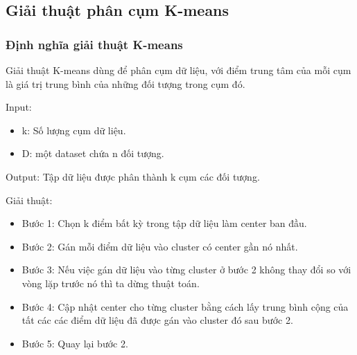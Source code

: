 \documentclass[a4paper,14pt]{extreport}
\begin{document}
\subsection{Giải thuật phân cụm K-means}

\subsubsection*{ Định nghĩa giải thuật K-means }

Giải thuật K-means dùng để phân cụm dữ liệu, với điểm trung tâm của mỗi cụm là giá trị trung bình của những đối tượng trong cụm đó.

Input:
\begin{itemize}
        \item k: Số lượng cụm dữ liệu.
        \item D: một dataset chứa n đối tượng.
\end{itemize}

Output: Tập dữ liệu được phân thành k cụm các đối tượng.

Giải thuật:

\begin{itemize}
        \item Bước 1: Chọn k điểm bất kỳ trong tập dữ liệu làm center ban đầu.
        \item Bước 2: Gán mỗi điểm dữ liệu vào cluster có center gần nó nhất.
        \item Bước 3: Nếu việc gán dữ liệu vào từng cluster ở bước 2 không thay đổi so với vòng lặp trước nó thì ta dừng thuật toán.
        \item Bước 4: Cập nhật center cho từng cluster bằng cách lấy trung bình cộng của tất các các điểm dữ liệu đã được gán vào cluster đó sau bước 2.
        \item Bước 5: Quay lại bước 2.
\end{itemize}
\end{document}
